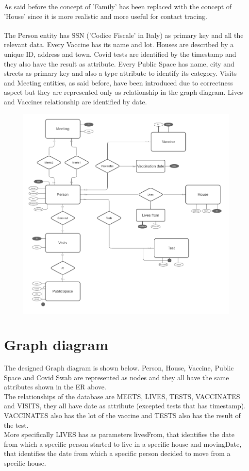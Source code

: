 \documentclass{article}
\begin{document}
As said before the concept of 'Family' has been replaced with the concept of 'House' since it is more realistic and more useful for contact tracing.
\\
\\The Person entity has SSN ('Codice Fiscale' in Italy) as primary key and all the relevant data. Every Vaccine has its name and lot. Houses are described by a unique ID, address and town.
Covid tests are identified by the timestamp and they also have the result as attribute. Every Public Space has name, city and streets as primary key and also a type attribute to identify its category.
Visits and Meeting entities, as said before, have been introduced due to correctness aspect but they are represented only as relationship in the graph diagram. Lives and Vaccines relationship are identified by date.

\begin{figure}[h]
\centering
\includegraphics[scale=0.25]{er.png}
\end{figure}
\newpage

\section{Graph diagram}
The designed Graph diagram is shown below. Person, House, Vaccine, Public Space and Covid Swab are represented as nodes and they all have the same attributes shown in the ER above.
\\The relationships of the database are MEETS, LIVES, TESTS, VACCINATES and VISITS, they all have date as attribute (excepted tests that has timestamp). VACCINATES also has the lot of the vaccine and TESTS also has the result of the test.
\\More specifically LIVES has as parameters livesFrom, that identifies the date from which a specific person started to live in a
specific house and movingDate, that identifies the date from which a specific person decided to move from a specific house.
\end{document}

